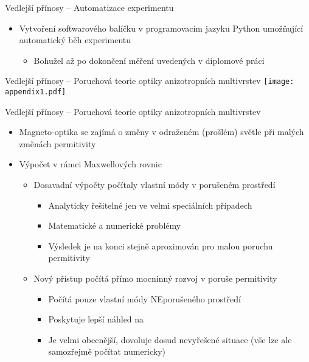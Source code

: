 \begin{frame}{Vedlejší přínosy -- Automatizace experimentu}
    \begin{itemize}
        \item Vytvoření softwarového balíčku v programovacím jazyku Python
            umožňující automatický běh experimentu
            \begin{itemize}
                \item Bohužel až po dokončení měření uvedených v diplomové práci
            \end{itemize}
    \end{itemize}
\end{frame}


\begin{frame}{Vedlejší přínosy -- Poruchová teorie optiky anizotropních multivrstev}
    \centering
    \texttt{[image: appendix1.pdf]}
\end{frame}

\begin{frame}{Vedlejší přínosy -- Poruchová teorie optiky anizotropních multivrstev}
    \begin{itemize}
        \item Magneto-optika se zajímá o změny v odraženém (prošlém) světle při malých změnách permitivity
        \item Výpočet v rámci Maxwellových rovnic
            \begin{itemize}
                \item Dosavadní výpočty počítaly vlastní módy v porušeném prostředí
                    \begin{itemize}
                        \item Analyticky řešitelné jen ve velmi speciálních případech
                        \item Matematické a numerické problémy
                        \item Výsledek je na konci stejně aproximován pro malou poruchu permitivity
                    \end{itemize}
                \item Nový přístup počítá přímo mocninný rozvoj v poruše permitivity
                    \begin{itemize}
                        \item Počítá pouze vlastní módy NEporušeného prostředí
                        \item Poskytuje lepší náhled na 
                        \item Je velmi obecnější, dovoluje dosud nevyřešené situace (vše lze ale samozřejmě počítat numericky)
                    \end{itemize}
            \end{itemize}
    \end{itemize}
\end{frame}



